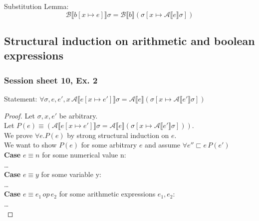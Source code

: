 \documentclass[12pt]{article}
\def\A{\mathcal{A}}
\def\B{\mathcal{B}}
\def\llb{\llbracket}
\def\rrb{\rrbracket}
\begin{document}
Substitution Lemma:
$$ \B \llb b [x \mapsto e]\rrb \sigma = \B \llb b\rrb (\sigma[x \mapsto \A \llb e \rrb \sigma])$$

\subsection{Structural induction on arithmetic and boolean expressions}
\subsubsection{Session sheet 10, Ex. 2}
Statement: $ \forall \sigma, e, e', x \, \A \llb e [x \mapsto e']\rrb \sigma = \A \llb e \rrb (\sigma[x \mapsto \A \llb e' \rrb \sigma])$
\begin{proof}
    Let $\sigma, x, e'$ be arbitrary. \\
    Let $P(e) \equiv (\A \llb e [x \mapsto e']\rrb \sigma = \A \llb e \rrb (\sigma[x \mapsto \A \llb e' \rrb \sigma]))$.\\
    We prove $\forall e. P(e)$ by strong structural induction on $e$. \\
    We want to show $P(e)$ for some arbitrary $e$ and assume $\forall e''  \sqsubset e \, P(e')$ \\
    \textbf{Case} $e \equiv n$ for some numerical value n:\\
    \dots \\
    \textbf{Case} $e \equiv y$ for some variable y:\\
    \dots \\
    \textbf{Case} $e \equiv e_1 \, op \, e_2$ for some arithmetic expressions $e_1, e_2$:\\
    \dots \\
\end{proof}
\end{document}
